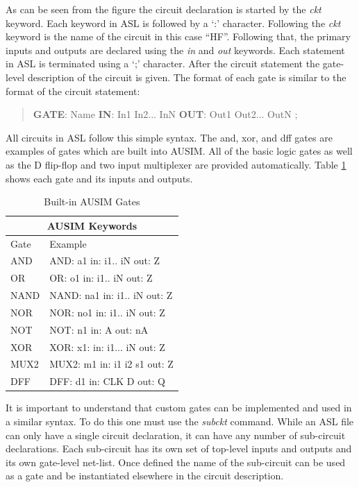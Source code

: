 \documentclass[12pt]{report}
\begin{document}
As can be seen from the figure the circuit declaration is started by the \textit{ckt} keyword.  Each keyword in ASL is followed by a `:' character.  Following the \textit{ckt} keyword is the name of the circuit in this case ``HF''.  Following that, the primary inputs and outputs are declared using the \textit{in} and \textit{out} keywords.  Each statement in ASL is terminated using a `;' character.  After the circuit statement the gate-level description of the circuit is given.  The format of each gate is similar to the format of the circuit statement:
\begin{quote}
	\textbf{GATE}: Name \textbf{IN}: In1 In2... InN \textbf{OUT}: Out1 Out2... OutN ;\cite{asl}
\end{quote}
All circuits in ASL follow this simple syntax.  The and, xor, and dff gates are examples of gates which are built into AUSIM.  All of the basic logic gates as well as the D flip-flop and two input multiplexer are provided automatically.  Table \ref{tbl:ASLGates} shows each gate and its inputs and outputs.
\begin{table}[bht]
\caption{Built-in AUSIM Gates\cite{asl}}
\begin{center}
\begin{tabular}{|l|l|}
\hline
\multicolumn{2}{|c|}{AUSIM Keywords} \\ \hline
Gate & Example \\ \hline
AND & AND: a1 in: i1.. iN out: Z \\ \hline
OR & OR: o1 in: i1.. iN out: Z \\ \hline
NAND & NAND: na1 in: i1.. iN out: Z \\ \hline
NOR & NOR: no1 in: i1.. iN out: Z \\ \hline
NOT & NOT: n1 in: A out: nA \\ \hline
XOR & XOR: x1: in: i1... iN out: Z \\ \hline
MUX2 & MUX2: m1 in: i1 i2 s1 out: Z \\ \hline
DFF & DFF: d1 in: CLK D out: Q \\ \hline
\end{tabular}
\end{center}
\label{tbl:ASLGates}
\end{table}

It is important to understand that custom gates can be implemented and used in a similar syntax.  To do this one must use the \textit{subckt} command.  While an ASL file can only have a single circuit declaration, it can have any number of sub-circuit declarations\cite{asl}.  Each sub-circuit has its own set of top-level inputs and outputs and its own gate-level net-list.  Once defined the name of the sub-circuit can be used as a gate and be instantiated elsewhere in the circuit description.  
\end{document}
